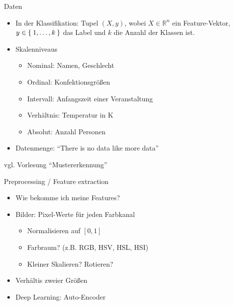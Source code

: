 \begin{frame}{Daten}
    \begin{itemize}
        \item In der Klassifikation:
              Tupel $(X, y)$, wobei $X \in \mathbb{R}^n$ ein Feature-Vektor, $y \in \Set{1, \dots, k}$ das Label und $k$ die Anzahl der Klassen ist.
        \item Skalenniveaus
            \begin{itemize}
                \item Nominal: Namen, Geschlecht
                \item Ordinal: Konfektionsgrößen
                \item Intervall: Anfangszeit einer Veranstaltung
                \item Verhältnis: Temperatur in K
                \item Absolut: Anzahl Personen
            \end{itemize}
        \item Datenmenge: \enquote{There is no data like more data}
    \end{itemize}

    vgl. Vorlesung \enquote{Mustererkennung}
\end{frame}

\begin{frame}{Preprocessing / Feature extraction}
    \begin{itemize}
        \item Wie bekomme ich meine Features?
        \item Bilder: Pixel-Werte für jeden Farbkanal
        \begin{itemize}
            \item Normalisieren auf $[0, 1]$
            \item Farbraum? (z.B. RGB, HSV, HSL, HSI)
            \item Kleiner Skalieren? Rotieren?
        \end{itemize}
        \item Verhältis zweier Größen
        \item Deep Learning: Auto-Encoder
    \end{itemize}
\end{frame}

